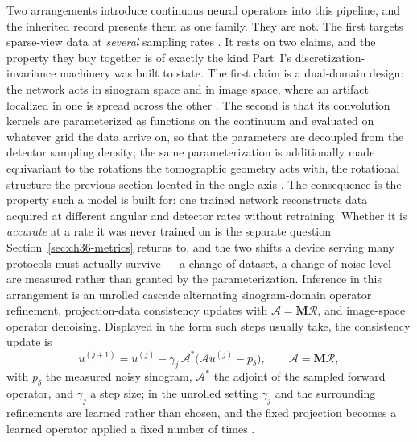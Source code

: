 Two arrangements introduce continuous neural operators into this pipeline, and
the inherited record presents them as one family. They are not. The first
targets sparse-view data at \emph{several} sampling rates
. It rests on two claims, and the property they buy
together is of exactly the kind Part~I's discretization-invariance machinery was
built to state. The first claim is a dual-domain design: the network acts in
sinogram space and in image space, where an artifact localized in one is spread
across the other . The second is that its
convolution kernels are parameterized as functions on the continuum and evaluated
on whatever grid the data arrive on, so that the parameters are decoupled from
the detector sampling density; the same parameterization is additionally made
equivariant to the rotations the tomographic geometry acts with, the rotational
structure the previous section located in the angle axis
. The consequence is the property such a model is built
for: one trained network reconstructs data acquired at different angular and
detector rates without retraining. Whether it is \emph{accurate} at a rate it was
never trained on is the separate question Section~\ref{sec:ch36-metrics} returns
to, and the two shifts a device serving many protocols must actually survive ---
a change of dataset, a change of noise level --- are measured rather than granted
by the parameterization. Inference in this arrangement is an unrolled
cascade alternating sinogram-domain operator refinement, projection-data
consistency updates with $\mathcal{A} = \mathbf{M}\mathcal{R}$, and image-space
operator denoising. Displayed in the form such steps usually take, the
consistency update is
\begin{equation}
  \label{eq:ch36-consistency}
  u^{(j+1)} = u^{(j)} - \gamma_j\, \mathcal{A}^{*}\big(\mathcal{A} u^{(j)} - p_\delta\big), \qquad \mathcal{A} = \mathbf{M}\mathcal{R},
\end{equation}
with $p_\delta$ the measured noisy sinogram, $\mathcal{A}^*$ the adjoint of the
sampled forward operator, and $\gamma_j$ a step size; in the unrolled setting
$\gamma_j$ and the surrounding refinements are learned rather than chosen, and
the fixed projection becomes a learned operator applied a fixed number of
times .

